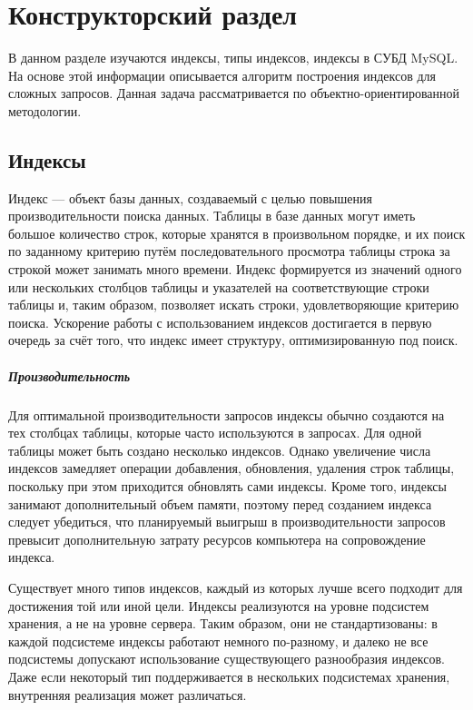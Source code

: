 \chapter{Конструкторский раздел}

В данном разделе изучаются индексы, типы индексов, индексы в СУБД MySQL. На основе этой информации описывается алгоритм построения индексов для сложных запросов. Данная задача рассматривается по объектно-ориентированной методологии. 

\section{Индексы}

Индекс — объект базы данных, создаваемый с целью повышения производительности поиска данных. Таблицы в базе данных могут иметь большое количество строк, которые хранятся в произвольном порядке, и их поиск по заданному критерию путём последовательного просмотра таблицы строка за строкой может занимать много времени. Индекс формируется из значений одного или нескольких столбцов таблицы и указателей на соответствующие строки таблицы и, таким образом, позволяет искать строки, удовлетворяющие критерию поиска. Ускорение работы с использованием индексов достигается в первую очередь за счёт того, что индекс имеет структуру, оптимизированную под поиск.

\paragraph{Производительность}
\label{paragraph:performance}

Для оптимальной производительности запросов индексы обычно создаются на тех столбцах таблицы, которые часто используются в запросах. Для одной таблицы может быть создано несколько индексов. Однако увеличение числа индексов замедляет операции добавления, обновления, удаления строк таблицы, поскольку при этом приходится обновлять сами индексы. Кроме того, индексы занимают дополнительный объем памяти, поэтому перед созданием индекса следует убедиться, что планируемый выигрыш в производительности запросов превысит дополнительную затрату ресурсов компьютера на сопровождение индекса. \cite{wikipedia.org:index}

Существует много типов индексов, каждый из которых лучше всего подходит для достижения той или иной цели. Индексы реализуются на уровне подсистем хранения, а не на уровне сервера. Таким образом, они не стандартизованы: в каждой подсистеме индексы работают немного по-разному, и далеко не все подсистемы допускают использование существующего разнообразия индексов. Даже если некоторый тип поддерживается в нескольких подсистемах хранения, внутренняя реализация может различаться. \cite{zaitsev} 

